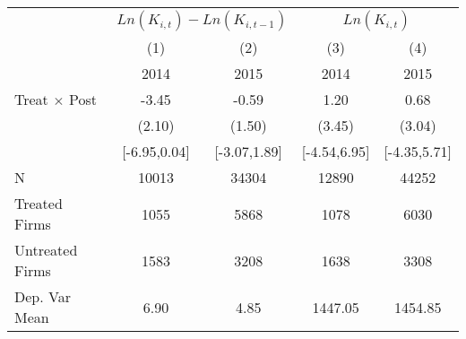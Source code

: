 \begin{tabular}{lcccc}
\toprule 
                    &\multicolumn{2}{c}{ $ Ln(K_{i,t}) - Ln(K_{i,t-1})$ }&\multicolumn{2}{c}{ $ Ln(K_{i,t})$ }\\\cmidrule(lr){2-3}\cmidrule(lr){4-5}
                    &         (1)   &         (2)   &         (3)   &         (4)   \\
                    &        2014   &        2015   &        2014   &        2015   \\
\midrule
Treat $\times$ Post &       -3.45   &       -0.59   &        1.20   &        0.68   \\
                    &      (2.10)   &      (1.50)   &      (3.45)   &      (3.04)   \\
                    &[-6.95,0.04]   &[-3.07,1.89]   &[-4.54,6.95]   &[-4.35,5.71]   \\
\addlinespace
\midrule
N                   &       10013   &       34304   &       12890   &       44252   \\
Treated Firms       &        1055   &        5868   &        1078   &        6030   \\
Untreated Firms     &        1583   &        3208   &        1638   &        3308   \\
Dep. Var Mean       &        6.90   &        4.85   &     1447.05   &     1454.85   \\
\midrule
\end{tabular}
